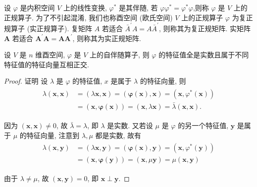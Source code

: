 \begin{definition}[正规算子]
    设 $\varphi$ 是内积空间 $V$ 上的线性变换, $\varphi^*$ 是其伴随, 若 $\varphi \varphi^*=\varphi^* \varphi$,则称 $\varphi$ 是 $V$ 上的正规算子. 为了不引起混淆, 我们也称酉空间 (欧氏空间) $V$ 上的正规算子 $\varphi$ 为复正规算子 (实正规算子). 复矩阵 $A$ 若适合 $\bar{A}^{\prime} A=A \bar{A}^{\prime}$, 则称其为复正规矩阵. 实矩阵 $\boldsymbol{A}$ 若适合 $\boldsymbol{A}^{\prime} \boldsymbol{A}=\boldsymbol{A} \boldsymbol{A}^{\prime}$, 则称其为实正规矩阵.
\end{definition}

\begin{theorem}\label{memeda11}
    设 $V$ 是 $n$ 维酉空间, $\varphi$ 是 $V$ 上的自伴随算子, 则 $\varphi$ 的特征值全是实数且属于不同特征值的特征向量互相正交.
\end{theorem}

\begin{proof}
    证明 设 $\lambda$ 是 $\varphi$ 的特征值, $x$ 是属于 $\lambda$ 的特征向量, 则
    \begin{align*}
        \begin{aligned}
            \lambda(\boldsymbol{x}, \boldsymbol{x}) & =(\lambda \boldsymbol{x}, \boldsymbol{x})=(\boldsymbol{\varphi}(\boldsymbol{x}), \boldsymbol{x})=\left(\boldsymbol{x}, \varphi^*(\boldsymbol{x})\right) \\
                                                    & =(\boldsymbol{x}, \boldsymbol{\varphi}(\boldsymbol{x}))=(\boldsymbol{x}, \lambda \boldsymbol{x})=\bar{\lambda}(\boldsymbol{x}, \boldsymbol{x}) .
        \end{aligned}
    \end{align*}

    因为 $(\boldsymbol{x}, \boldsymbol{x}) \neq 0$, 故 $\bar{\lambda}=\lambda$, 即 $\lambda$ 是实数. 又若设 $\mu$ 是 $\varphi$ 的另一个特征值, $\boldsymbol{y}$ 是属于 $\mu$ 的特征向量, 注意到 $\lambda, \mu$ 都是实数, 故有
    \begin{align*}
        \begin{aligned}
            \lambda(\boldsymbol{x}, \boldsymbol{y}) & =(\lambda \boldsymbol{x}, \boldsymbol{y})=(\boldsymbol{\varphi}(\boldsymbol{x}), \boldsymbol{y})=\left(\boldsymbol{x}, \varphi^*(\boldsymbol{y})\right) \\
                                                    & =(\boldsymbol{x}, \boldsymbol{\varphi}(\boldsymbol{y}))=(\boldsymbol{x}, \mu \boldsymbol{y})=\mu(\boldsymbol{x}, \boldsymbol{y})
        \end{aligned}
    \end{align*}

    由于 $\lambda \neq \mu$, 故 $(\boldsymbol{x}, \boldsymbol{y})=0$, 即 $\boldsymbol{x} \perp \boldsymbol{y}$.
\end{proof}

